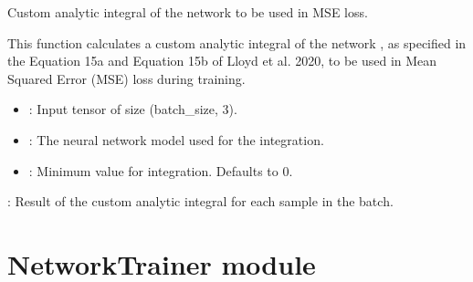 \documentclass[letterpaper,10pt,english]{sphinxmanual}
\begin{document}
\begin{fulllineitems}
\begin{fulllineitems}
\label{\detokenize{NetworkHelper:NetworkHelper.NetworkHelper.integral}}
\pysigstartsignatures
{}
\pysigstopsignatures
\sphinxAtStartPar
Custom analytic integral of the network  to be used in MSE loss.
\begin{description}
\sphinxAtStartPar
This function calculates a custom analytic integral of the network ,
as specified in the Equation 15a and Equation 15b of Lloyd et al. 2020,
to be used in Mean Squared Error (MSE) loss during training.

\begin{itemize}
\item {} 
\sphinxAtStartPar
{}: Input tensor of size (batch\_size, 3).

\item {} 
\sphinxAtStartPar
{}: The neural network model used for the integration.

\item {} 
\sphinxAtStartPar
{}: Minimum value for integration. Defaults to 0.

\end{itemize}

\sphinxAtStartPar
{}: Result of the custom analytic integral for each sample in the batch.

\end{description}

\end{fulllineitems}


\end{fulllineitems}


\sphinxstepscope


\section{NetworkTrainer module}
\label{\detokenize{NetworkTrainer:module-NetworkTrainer}}\label{\detokenize{NetworkTrainer:networktrainer-module}}\label{\detokenize{NetworkTrainer::doc}}
\end{document}
